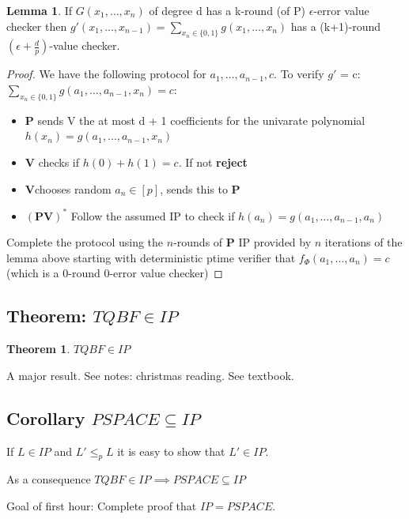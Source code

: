 \documentclass[a4paper,12pt]{article}
\theoremstyle{definition}
\newtheorem{lemma}[counter]{Lemma}
\newtheorem{theorem}[counter]{Theorem}
\theoremstyle{remark}
\begin{document}
\begin{lemma}
    If $G(x_1, \dots, x_n)$ of degree d has a k-round (of P) $\epsilon$-error value checker then
    $g'(x_1, \dots, x_{n-1}) = \sum_{x_n \in \{0, 1\}} g(x_1, \dots, x_n)$ has a (k+1)-round
    $(\epsilon + \frac{d}{p})$-value checker.
\end{lemma}

\begin{proof}
    We have the following protocol for $a_1, \dots, a_{n-1}, c$. To verify $g'$ = c: $\sum_{x_n \in \{0, 1\}} g(a_1, \dots, a_{n-1}, x_n) = c$:
    \begin{itemize}
        \item \textbf{P} sends V the at most d + 1 coefficients for the univarate polynomial $h(x_n) = g(a_1, \dots, a_{n-1}, x_n)$
        \item \textbf{V} checks if $h(0) + h(1) = c$. If not \textbf{reject}
        \item \textbf{V}chooses random $a_n \in [p]$, sends this to \textbf{P}
        \item $(\textbf{PV})^*$ Follow the assumed IP to check if $h(a_n) = g(a_1, \dots, a_{n-1}, a_n)$
    \end{itemize}
    
    Complete the protocol using the $n$-rounds of \textbf{P} IP provided by $n$ iterations of the lemma above starting with deterministic ptime verifier that
    $f_{\Phi} (a_1, \dots, a_n) = c$ (which is a 0-round 0-error value checker)
\end{proof}


\subsection{Theorem: $TQBF \in IP$}
\begin{theorem}
    $TQBF \in IP$
\end{theorem}
A major result. See notes: christmas reading. See textbook.
\subsection*{Corollary $PSPACE \subseteq IP$}
If $L \in IP$ and $L' \leq_p L$ it is easy to show that $L' \in IP$.

As a consequence $TQBF \in IP \implies PSPACE \subseteq IP$







\newpage
Goal of first hour: Complete proof that $IP = PSPACE$.
\end{document}
